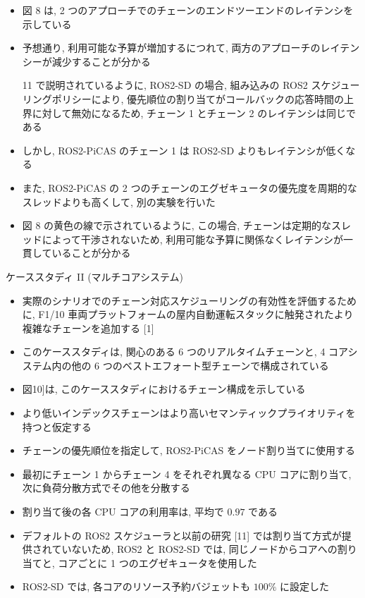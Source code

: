 \begin{frame}{}
    \begin{itemize}
        \item 図 8 は, 2 つのアプローチでのチェーンのエンドツーエンドのレイテンシを示している
\item 予想通り, 利用可能な予算が増加するにつれて, 両方のアプローチのレイテンシーが減少することが分かる
\item [11] で説明されているように, ROS2-SD の場合, 組み込みの ROS2 スケジューリングポリシーにより, 優先順位の割り当てがコールバックの応答時間の上界に対して無効になるため, チェーン 1 とチェーン 2 のレイテンシは同じである
\item しかし, ROS2-PiCAS のチェーン 1 は ROS2-SD よりもレイテンシが低くなる
\item また, ROS2-PiCAS の 2 つのチェーンのエグゼキュータの優先度を周期的なスレッドよりも高くして, 別の実験を行いた
\item 図 8 の黄色の線で示されているように, この場合, チェーンは定期的なスレッドによって干渉されないため, 利用可能な予算に関係なくレイテンシが一貫していることが分かる
    \end{itemize}
\end{frame}

\begin{frame}{ケーススタディ II (マルチコアシステム)}
    \begin{itemize}
        \item 実際のシナリオでのチェーン対応スケジューリングの有効性を評価するために, F1/10 車両プラットフォームの屋内自動運転スタックに触発されたより複雑なチェーンを追加する [1]
\item このケーススタディは, 関心のある 6 つのリアルタイムチェーンと, 4 コアシステム内の他の 6 つのベストエフォート型チェーンで構成されている
\item 図10]は, このケーススタディにおけるチェーン構成を示している
\item より低いインデックスチェーンはより高いセマンティックプライオリティを持つと仮定する
\item チェーンの優先順位を指定して, ROS2-PiCAS をノード割り当てに使用する
\item 最初にチェーン 1 からチェーン 4 をそれぞれ異なる CPU コアに割り当て, 次に負荷分散方式でその他を分散する
\item 割り当て後の各 CPU コアの利用率は, 平均で $0.97$ である
\item デフォルトの ROS2 スケジューラと以前の研究 [11] では割り当て方式が提供されていないため, ROS2 と ROS2-SD では, 同じノードからコアへの割り当てと, コアごとに 1 つのエグゼキュータを使用した
\item ROS2-SD では, 各コアのリソース予約バジェットも $100 \%$ に設定した
    \end{itemize}
\end{frame}

